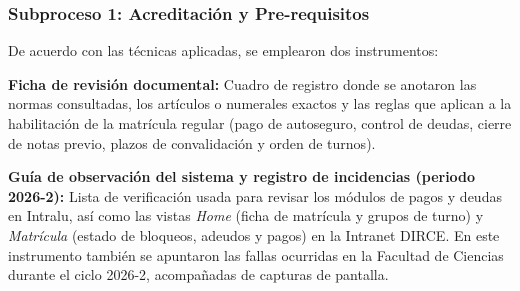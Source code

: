 \subsubsection{Subproceso 1: Acreditación y Pre-requisitos}

De acuerdo con las técnicas aplicadas, se emplearon dos instrumentos:

\textbf{Ficha de revisión documental:} Cuadro de registro donde se anotaron las normas consultadas, los artículos o numerales exactos y las reglas que aplican a la habilitación de la matrícula regular (pago de autoseguro, control de deudas, cierre de notas previo, plazos de convalidación y orden de turnos).

\textbf{Guía de observación del sistema y registro de incidencias (periodo 2026-2):} Lista de verificación usada para revisar los módulos de pagos y deudas en Intralu, así como las vistas \textit{Home} (ficha de matrícula y grupos de turno) y \textit{Matrícula} (estado de bloqueos, adeudos y pagos) en la Intranet DIRCE. En este instrumento también se apuntaron las fallas ocurridas en la Facultad de Ciencias durante el ciclo 2026-2, acompañadas de capturas de pantalla.
